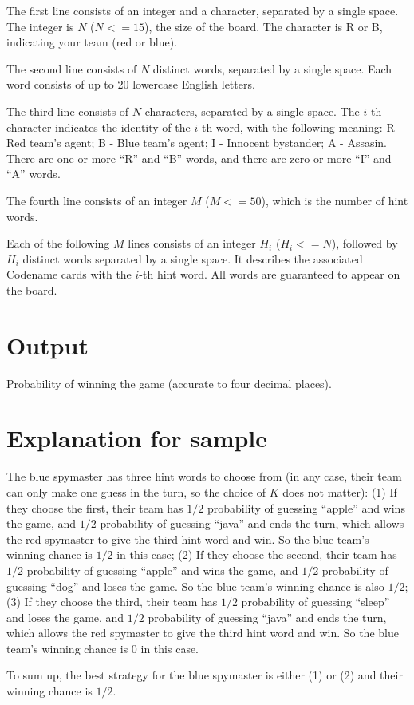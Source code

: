 \documentclass[11pt,letterpaper]{article}
\begin{document}
The first line consists of an integer and a character, separated by a single space. The integer is $N$ ($N <= 15$), the size of the board. The character is R or B, indicating your team (red or blue).

The second line consists of $N$ distinct words, separated by a single space. Each word consists of up to 20 lowercase English letters.

The third line consists of $N$ characters, separated by a single space. The $i$-th character indicates the identity of the $i$-th word, with the following meaning: R - Red team's agent; B - Blue team's agent; I - Innocent bystander; A - Assasin. There are one or more ``R'' and ``B'' words, and there are zero or more ``I'' and ``A'' words.

The fourth line consists of an integer $M$ ($M <= 50$), which is the number of hint words.

Each of the following $M$ lines consists of an integer $H_i$ ($H_i <= N$), followed by $H_i$ distinct words separated by a single space. It describes the associated Codename cards with the $i$-th hint word. All words are guaranteed to appear on the board.

\section*{Output}

Probability of winning the game (accurate to four decimal places).

\section*{Explanation for sample}

The blue spymaster has three hint words to choose from (in any case, their team can only make one guess in the turn, so the choice of $K$ does not matter):
(1) If they choose the first, their team has $1/2$ probability of guessing ``apple'' and wins the game, and $1/2$ probability of guessing ``java'' and ends the turn, which allows the red spymaster to give the third hint word and win. So the blue team's winning chance is $1/2$ in this case;
(2) If they choose the second, their team has $1/2$ probability of guessing ``apple'' and wins the game, and $1/2$ probability of guessing ``dog'' and loses the game. So the blue team's winning chance is also $1/2$;
(3) If they choose the third, their team has $1/2$ probability of guessing ``sleep'' and loses the game, and $1/2$ probability of guessing ``java'' and ends the turn, which allows the red spymaster to give the third hint word and win. So the blue team's winning chance is $0$ in this case.

To sum up, the best strategy for the blue spymaster is either (1) or (2) and their winning chance is $1/2$.



\end{document}
